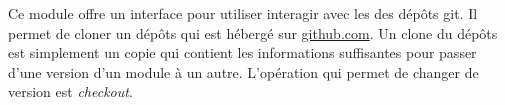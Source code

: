 Ce module offre un interface pour utiliser interagir avec les des dépôts git.
Il permet de cloner un dépôts qui est hébergé sur \url{github.com}. Un clone du
dépôts est simplement un copie qui contient les informations suffisantes pour
passer d'une version d'un module à un autre. L'opération qui permet de changer
de version est \emph{checkout}.


%
%
%
%
%
%
%
%
%
%
%
%
%
%
%
%
%
%
%


